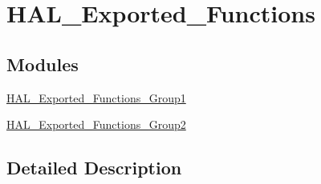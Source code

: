 \hypertarget{group___h_a_l___exported___functions}{}\section{H\+A\+L\+\_\+\+Exported\+\_\+\+Functions}
\label{group___h_a_l___exported___functions}
\subsection*{Modules}
\begin{DoxyCompactItemize}
\item 
\hyperlink{group___h_a_l___exported___functions___group1}{H\+A\+L\+\_\+\+Exported\+\_\+\+Functions\+\_\+\+Group1}
\item 
\hyperlink{group___h_a_l___exported___functions___group2}{H\+A\+L\+\_\+\+Exported\+\_\+\+Functions\+\_\+\+Group2}
\end{DoxyCompactItemize}


\subsection{Detailed Description}
